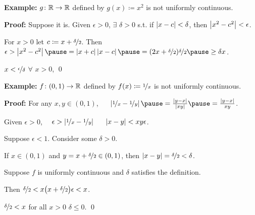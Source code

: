 \documentclass[10pt,aspectratio=169]{beamer}
\begin{document}
\begin{frame}

\textbf{Example:}
$g \colon {\mathbb{R}} \to {\mathbb{R}}$ defined by $g(x) \coloneqq x^2$ is not uniformly
continuous.

\pause
\medskip

\textbf{Proof:} Suppose it is.
\pause
Given $\epsilon > 0$,
$\exists$ $\delta > 0$ s.t.
if $\left\lvert {x-c} \right\rvert < \delta$, then $\left\lvert {x^2 -c^2} \right\rvert < \epsilon$.

\pause
For $x > 0$ let $c \coloneqq x+\nicefrac{\delta}{2}$.
\pause
Then
$\epsilon >
\abs{x^2-c^2}
\pause
= \abs{x+c}\abs{x-c}
\pause
=
(2x+\nicefrac{\delta}{2})\nicefrac{\delta}{2} 
\pause
\geq 
\delta x$.

\pause
\thus \quad $x < \nicefrac{\epsilon}{\delta}$ $\forall$ $x > 0$,
\pause
\quad
\contradiction
\qed

\pause
\medskip

\textbf{Example:}
$f \colon (0,1) \to {\mathbb{R}}$ defined by $f(x) \coloneqq \nicefrac{1}{x}$ is not
uniformly continuous.

\pause
\medskip

\textbf{Proof:}
For any $x,y \in (0,1)$, ~~
$\abs{\nicefrac{1}{x}-\nicefrac{1}{y}}
\pause
=
\frac{\abs{y-x}}{\abs{xy}} 
\pause
=
\frac{\abs{y-x}}{xy}$.

\pause
\medskip

Given $\epsilon > 0$,~~
$\epsilon >
\left\lvert {\nicefrac{1}{x}-\nicefrac{1}{y}} \right\rvert$ ~\iffif~
$\left\lvert {x-y} \right\rvert < xy \epsilon$.

\pause
Suppose $\epsilon < 1$.  Consider some $\delta > 0$.

\pause
If $x \in (0,1)$ and 
$y = x+\nicefrac{\delta}{2} \in (0,1)$,
then $\left\lvert {x-y} \right\rvert = \nicefrac{\delta}{2} < \delta$.

\pause
Suppose $f$ is uniformly continuous and
$\delta$ satisfies the definition.

\pause
Then $\nicefrac{\delta}{2} < x \bigl( x+\nicefrac{\delta}{2} \bigr) \epsilon < x$.

\pause
\medskip

$\nicefrac{\delta}{2} < x$ for all $x > 0$
\wthus
$\delta \leq 0$.
\pause
\quad
\contradiction
\qed
\end{frame}
\end{document}

